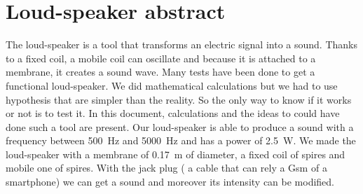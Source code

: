 

\section{Loud-speaker abstract}

The loud-speaker is a tool that transforms an electric signal into a sound.  Thanks to a fixed coil, a mobile coil can oscillate and because it is attached to a membrane, it creates a sound wave.  
Many tests have been done to get a functional loud-speaker.  We did mathematical calculations but we had to use hypothesis that are simpler than the reality.  So the only way to know if it works or not is to test it.
In this document, calculations and the ideas to could have done such a tool are present.  
Our loud-speaker is able to produce a sound with a frequency between \SI{500}{\hertz} and \SI{5000}{\hertz} and has a power of \SI{2.5}{\watt}.  We made the loud-speaker with a membrane of \SI{0.17}{\meter} of diameter, a fixed coil of  spires and mobile one of  spires.  With the jack plug ( a cable that can rely a Gsm of a smartphone) we can get a sound and moreover its intensity can be modified.


